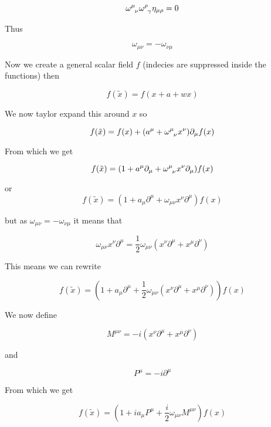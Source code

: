 $$\omega\ein{\mu}{\nu}\omega\ein{\rho}{\gamma}\eta_{\mu\rho}=0$$

Thus 

$$\omega_{\mu\nu}=-\omega_{\nu\mu}$$

Now we create a general scalar field $f$ (indecies are suppressed inside the functions) then

$$f(\tilde{x})=f(x+a+wx)$$

We now taylor expand this around $x$ so

$$f(\tilde{x})=f(x)+(a^\mu+\omega\ein{\mu}{\nu}x^\nu)\partial_\mu f(x)$$

From which we get

$$f(\tilde{x})=(1+a^\mu\partial_\mu+\omega\ein{\mu}{\nu}x^\nu\partial_\mu) f(x)$$

or
$$f(\tilde{x})=(1+a_\mu\partial^\mu+\omega_{\mu\nu}x^\nu\partial^\mu) f(x)$$


but as $\omega_{\mu\nu}=-\omega_{\nu\mu}$ it means that 

$$\omega_{\mu\nu}x^\nu\partial^\mu=\frac{1}{2}\omega_{\mu\nu}(x^\nu\partial^\mu+x^\mu\partial^\nu)$$

This means we can rewrite

$$f(\tilde{x})=(1+a_\mu\partial^\mu+\frac{1}{2}\omega_{\mu\nu}(x^\nu\partial^\mu+x^\mu\partial^\nu)) f(x)$$

We now define

$$M^{\mu\nu}=-i(x^\nu\partial^\mu+x^\mu\partial^\nu)$$

and

$$P^\mu=-i\partial^\mu$$

From which we get

$$f(\tilde{x})=(1+ia_\mu P^\mu+\frac{i}{2}\omega_{\mu\nu}M^{\mu\nu}) f(x)$$



